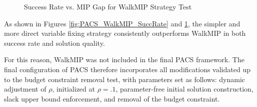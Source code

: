 \begin{figure}[H]
\centering
\begin{minipage}{0.6\columnwidth}
\centering
\resizebox{\linewidth}{!}{}
\end{minipage}%
\hfill
\begin{minipage}{0.4\columnwidth}
\centering
\resizebox{\linewidth}{!}{}
\end{minipage}
\caption{Success Rate vs. MIP Gap for WalkMIP Strategy Test}
\label{fig:PACS_WalkMIP_MGAP}
\end{figure}

As shown in Figures \ref{fig:PACS_WalkMIP_SuccRate} and \ref{fig:PACS_WalkMIP_MGAP}, the simpler and more direct variable fixing strategy consistently outperforms WalkMIP in both success rate and solution quality.

For this reason, WalkMIP was not included in the final PACS framework. The final configuration of PACS therefore incorporates all modifications validated up to the budget constraint removal test, with parameters set as follows: dynamic adjustment of $\rho$, initialized at $\rho=.1$, parameter-free initial solution construction, slack upper bound enforcement, and removal of the budget constraint.

